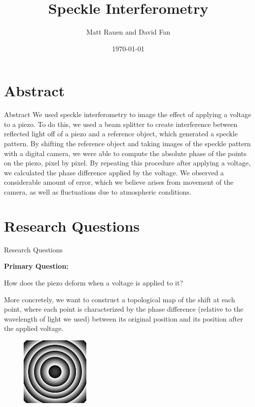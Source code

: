 \documentclass[pdf]{beamer}
\title{Speckle Interferometry}
\author{Matt Rauen and David Fan}
\date{\today}
\begin{document}
\begin{frame}
\titlepage
\end{frame}

\section{Abstract}
\begin{frame}{Abstract}
We used speckle interferometry to image the effect of applying a voltage to a piezo. To do this, we used a beam splitter to create interference between reflected light off of a piezo and a reference object, which generated a speckle pattern. By shifting the reference object and taking images of the speckle pattern with a digital camera, we were able to compute the absolute phase of the points on the piezo, pixel by pixel. By repeating this procedure after applying a voltage, we calculated the phase difference applied by the voltage. We observed a considerable amount of error, which we believe arises from movement of the camera, as well as fluctuations due to atmospheric conditions.
\end{frame}

\section{Research Questions}
\begin{frame}{Research Questions}
\begin{center}
{\bf Primary Question:}

How does the piezo deform when a voltage is applied to it?
\end{center}
More concretely, we want to construct a topological map of the shift at each point, where each point is characterized by the phase difference (relative to the wavelength of light we used) between its original position and its position after the applied voltage.
\begin{figure}[htbp]
\centering
\includegraphics[width=0.3\textwidth]{gaussian_bump.png}
\end{figure}
\end{frame}
\end{document}
